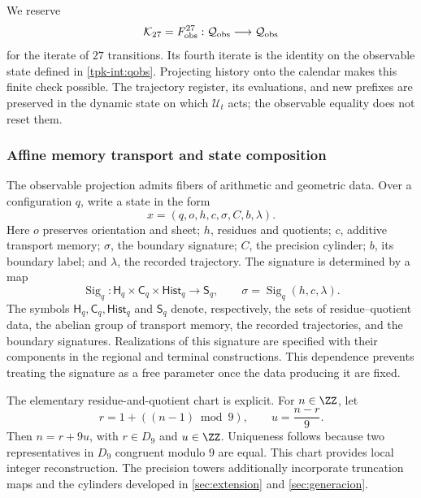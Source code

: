 We reserve
\[
 \mathcal K_{27}=F_{\rm obs}^{27}:
 \mathcal Q_{\rm obs}\longrightarrow\mathcal Q_{\rm obs}
\]
for the iterate of \(27\) transitions. Its fourth iterate is the
identity on the observable state defined in \eqref{tpk-int:qobs}.
Projecting history onto the calendar makes this finite
check possible. The trajectory register, its evaluations, and
new prefixes are preserved in the dynamic state on which
\(\mathcal U_t\) acts; the observable equality does not reset them.

\subsubsection{Affine memory transport and state composition}
\label{tpk-int:memoria}

The observable projection admits fibers of arithmetic and geometric data.
Over a configuration \(q\), write a state in the form
\[
 x=(q,o,h,c,\sigma,C,b,\lambda).
\]
Here \(o\) preserves orientation and sheet; \(h\), residues
and quotients; \(c\), additive transport memory; \(\sigma\),
the boundary signature; \(C\), the precision cylinder; \(b\), its
boundary label; and \(\lambda\), the recorded trajectory. The
signature is determined by a map
\[
 \operatorname{Sig}_q:
 \mathsf H_q\times\mathsf C_q\times\mathsf{Hist}_q
 \longrightarrow\mathsf S_q,
 \qquad \sigma=\operatorname{Sig}_q(h,c,\lambda).
\]
The symbols \(\mathsf H_q,\mathsf C_q,\mathsf{Hist}_q\) and
\(\mathsf S_q\) denote, respectively, the sets of
residue--quotient data, the abelian group of transport memory, the
recorded trajectories, and the boundary signatures.
Realizations of this signature are specified with their components in
the regional and terminal constructions. This dependence prevents
treating the signature as a free parameter once the data producing it are fixed.

The elementary residue-and-quotient chart is explicit. For
\(n\in\ZZ\), let
\[
 r=1+((n-1)\bmod9),\qquad u=\frac{n-r}{9}.
\]
Then \(n=r+9u\), with \(r\in D_9\) and \(u\in\ZZ\).
Uniqueness follows because two representatives in \(D_9\) congruent
modulo \(9\) are equal. This chart provides local integer
reconstruction. The precision towers additionally incorporate truncation
maps and the cylinders developed in
\ref{sec:extension} and \ref{sec:generacion}.

